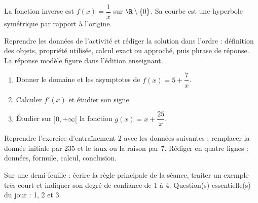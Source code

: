 \begin{traceecrite}La fonction inverse est $f(x)=\dfrac1x$ sur $\R\setminus\{0\}$. Sa courbe est une hyperbole symétrique par rapport à l'origine.\end{traceecrite}

\begin{exemple}
Reprendre les données de l'activité et rédiger la solution dans l'ordre : définition des objets, propriété utilisée, calcul exact ou approché, puis phrase de réponse. La réponse modèle figure dans l'édition enseignant.
\end{exemple}

\begin{exercice}[-- essentiel]
\begin{enumerate}\item Donner le domaine et les asymptotes de $f(x)=5+\dfrac{7}x$.\item Calculer $f'(x)$ et étudier son signe.\item Étudier sur $]0,+\infty[$ la fonction $g(x)=x+\dfrac{25}x$.\end{enumerate}
\end{exercice}


\begin{dm}Reprendre l'exercice d'entraînement 2 avec les données suivantes : remplacer la donnée initiale par $235$ et le taux ou la raison par $7$. Rédiger en quatre lignes : données, formule, calcul, conclusion.\end{dm}

\begin{sortie}Sur une demi-feuille : écrire la règle principale de la séance, traiter un exemple très court et indiquer son degré de confiance de 1 à 4. Question(s) essentielle(s) du jour : 1, 2 et 3.\end{sortie}

